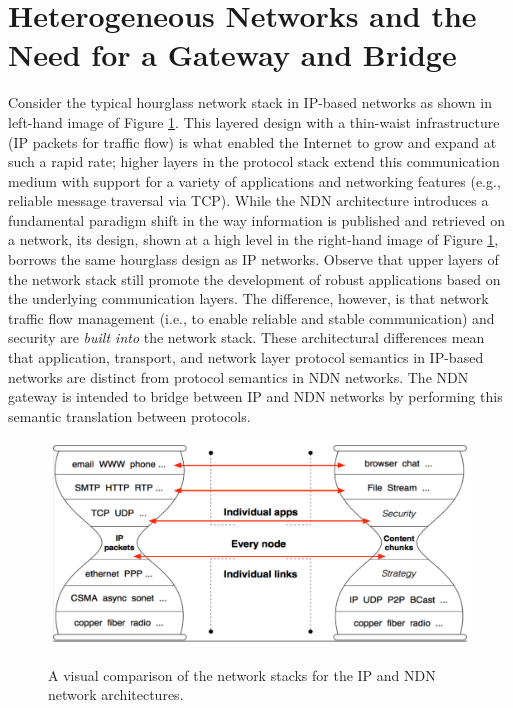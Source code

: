 \section{Heterogeneous Networks and the Need for a Gateway and Bridge}
Consider the typical hourglass network stack in IP-based networks as shown in left-hand image of Figure \ref{fig:hourglass}. This layered design with a thin-waist infrastructure (IP packets for traffic flow) is what enabled the Internet to grow and expand at such a rapid rate; higher layers in the protocol stack extend this communication medium with support for a variety of applications and networking features (e.g., reliable message traversal via TCP). While the NDN architecture introduces a fundamental paradigm shift in the way information is published and retrieved on a network, its design, shown at a high level in the right-hand image of Figure \ref{fig:hourglass}, borrows the same hourglass design as IP networks. Observe that upper layers of the network stack still promote the development of robust applications based on the underlying communication layers. The difference, however, is that network traffic flow management (i.e., to enable reliable and stable communication) and security are \emph{built into} the network stack. These architectural differences mean that application, transport, and network layer protocol semantics in IP-based networks are distinct from protocol semantics in NDN networks. The NDN gateway is intended to bridge between IP and NDN networks by performing this semantic translation between protocols. 

\begin{figure}[ht!]
\begin{center}
\includegraphics[scale=0.32]{./images/hourglass_conn.pdf}
\label{fig:hourglass}
\caption{A visual comparison of the network stacks for the IP and NDN network architectures.}
\end{center}
\end{figure}

